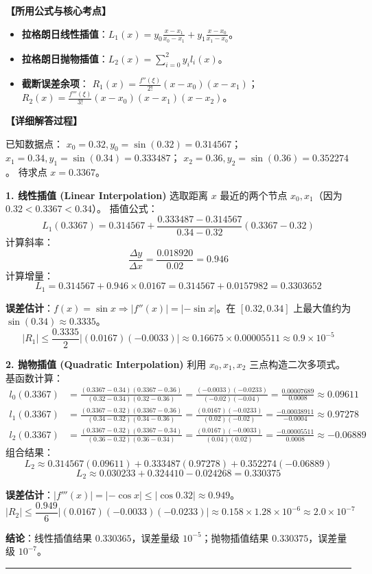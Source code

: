 \documentclass[a4paper,12pt]{ctexart}
\newcommand{\solitem}[3]{
    \vspace{1.5em}
    \begin{tcolorbox}[colback=gray!5!white, colframe=gray!50!black, title=\textbf{题目 #1}]
    \end{tcolorbox}
    
    \noindent\textbf{【所用公式与核心考点】}
    \begin{itemize}[leftmargin=2em, label=$\diamond$]
        #2
    \end{itemize}
    
    \noindent\textbf{【详细解答过程】}
    \par
    #3
    \par
    \vspace{1em}
    \hrule
}
\begin{document}
\solitem{[2]}{
    \item \textbf{拉格朗日线性插值}：$L_1(x) = y_0 \frac{x-x_1}{x_0-x_1} + y_1 \frac{x-x_0}{x_1-x_0}$。
    \item \textbf{拉格朗日抛物插值}：$L_2(x) = \sum_{i=0}^2 y_i l_i(x)$。
    \item \textbf{截断误差余项}：
    $R_1(x) = \frac{f''(\xi)}{2!}(x-x_0)(x-x_1)$；
    $R_2(x) = \frac{f'''(\xi)}{3!}(x-x_0)(x-x_1)(x-x_2)$。
}{
    已知数据点：
    $x_0 = 0.32, y_0 = \sin(0.32) = 0.314567$；
    $x_1 = 0.34, y_1 = \sin(0.34) = 0.333487$；
    $x_2 = 0.36, y_2 = \sin(0.36) = 0.352274$。
    待求点 $x = 0.3367$。
  
    \textbf{1. 线性插值 (Linear Interpolation)}
    选取距离 $x$ 最近的两个节点 $x_0, x_1$（因为 $0.32 < 0.3367 < 0.34$）。
    插值公式：
    \[ L_1(0.3367) = 0.314567 + \frac{0.333487 - 0.314567}{0.34 - 0.32}(0.3367 - 0.32) \]
    计算斜率：
    \[ \frac{\Delta y}{\Delta x} = \frac{0.018920}{0.02} = 0.946 \]
    计算增量：
    \[ L_1 = 0.314567 + 0.946 \times 0.0167 = 0.314567 + 0.0157982 = 0.3303652 \]
  
    \textbf{误差估计}：$f(x) = \sin x \Rightarrow |f''(x)| = |-\sin x|$。在 $[0.32, 0.34]$ 上最大值约为 $\sin(0.34) \approx 0.3335$。
    \[ |R_1| \le \frac{0.3335}{2} |(0.0167)(-0.0033)| \approx 0.16675 \times 0.00005511 \approx 0.9 \times 10^{-5} \]
  
    \textbf{2. 抛物插值 (Quadratic Interpolation)}
    利用 $x_0, x_1, x_2$ 三点构造二次多项式。
    基函数计算：
    \begin{align*}
    l_0(0.3367) &= \frac{(0.3367-0.34)(0.3367-0.36)}{(0.32-0.34)(0.32-0.36)} = \frac{(-0.0033)(-0.0233)}{(-0.02)(-0.04)} = \frac{0.00007689}{0.0008} \approx 0.09611 \\
    l_1(0.3367) &= \frac{(0.3367-0.32)(0.3367-0.36)}{(0.34-0.32)(0.34-0.36)} = \frac{(0.0167)(-0.0233)}{(0.02)(-0.02)} = \frac{-0.00038911}{-0.0004} \approx 0.97278 \\
    l_2(0.3367) &= \frac{(0.3367-0.32)(0.3367-0.34)}{(0.36-0.32)(0.36-0.34)} = \frac{(0.0167)(-0.0033)}{(0.04)(0.02)} = \frac{-0.00005511}{0.0008} \approx -0.06889
    \end{align*}
    组合结果：
    \[ L_2 \approx 0.314567(0.09611) + 0.333487(0.97278) + 0.352274(-0.06889) \]
    \[ L_2 \approx 0.030233 + 0.324410 - 0.024268 = 0.330375 \]
  
    \textbf{误差估计}：$|f'''(x)| = |-\cos x| \le |\cos 0.32| \approx 0.949$。
    \[ |R_2| \le \frac{0.949}{6} |(0.0167)(-0.0033)(-0.0233)| \approx 0.158 \times 1.28 \times 10^{-6} \approx 2.0 \times 10^{-7} \]
  
    \textbf{结论}：线性插值结果 $0.330365$，误差量级 $10^{-5}$；抛物插值结果 $0.330375$，误差量级 $10^{-7}$。
}
\end{document}
